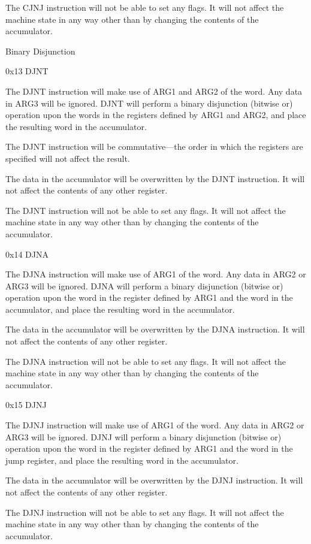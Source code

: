 \documentclass[]{article}
\begin{document}
The CJNJ instruction will not be able to set any flags. It will not
affect the machine state in any way other than by changing the contents
of the accumulator.

Binary Disjunction

0x13 DJNT

The DJNT instruction will make use of ARG1 and ARG2 of the word. Any
data in ARG3 will be ignored. DJNT will perform a binary disjunction
(bitwise or) operation upon the words in the registers defined by ARG1
and ARG2, and place the resulting word in the accumulator.

The DJNT instruction will be commutative---the order in which the
registers are specified will not affect the result.

The data in the accumulator will be overwritten by the DJNT instruction.
It will not affect the contents of any other register.

The DJNT instruction will not be able to set any flags. It will not
affect the machine state in any way other than by changing the contents
of the accumulator.

0x14 DJNA

The DJNA instruction will make use of ARG1 of the word. Any data in ARG2
or ARG3 will be ignored. DJNA will perform a binary disjunction (bitwise
or) operation upon the word in the register defined by ARG1 and the word
in the accumulator, and place the resulting word in the accumulator.

The data in the accumulator will be overwritten by the DJNA instruction.
It will not affect the contents of any other register.

The DJNA instruction will not be able to set any flags. It will not
affect the machine state in any way other than by changing the contents
of the accumulator.

0x15 DJNJ

The DJNJ instruction will make use of ARG1 of the word. Any data in ARG2
or ARG3 will be ignored. DJNJ will perform a binary disjunction (bitwise
or) operation upon the word in the register defined by ARG1 and the word
in the jump register, and place the resulting word in the accumulator.

The data in the accumulator will be overwritten by the DJNJ instruction.
It will not affect the contents of any other register.

The DJNJ instruction will not be able to set any flags. It will not
affect the machine state in any way other than by changing the contents
of the accumulator.
\end{document}

